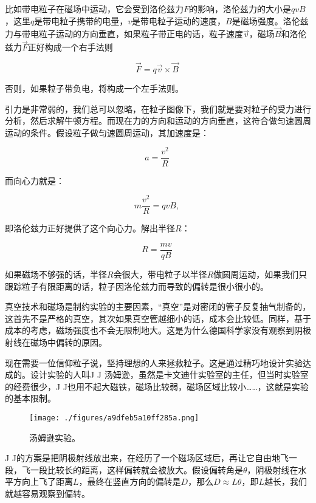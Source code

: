 比如带电粒子在磁场中运动，它会受到洛伦兹力$F$的影响，洛伦兹力的大小是$q v B$，这里$q$是带电粒子携带的电量，$v$是带电粒子运动的速度，$B$是磁场强度。洛伦兹力与带电粒子运动的方向垂直，如果粒子带正电的话，粒子速度$\vec v$，磁场$\vec B$和洛伦兹力$\vec F$正好构成一个右手法则

\begin{equation}
\vec F = q \vec v \times \vec B~
\end{equation}

否则，如果粒子带负电，将构成一个左手法则。

引力是非常弱的，我们总可以忽略，在粒子图像下，我们就是要对粒子的受力进行分析，然后求解牛顿方程。而现在力的方向和运动的方向垂直，这符合做匀速圆周运动的条件。假设粒子做匀速圆周运动，其加速度是：

\begin{equation}
a = \frac{v^2 }{R }~
\end{equation}

而向心力就是：

\begin{equation}
m \frac{v^2}{R} = q v B,~
\end{equation}

即洛伦兹力正好提供了这个向心力。解出半径$R$：

\begin{equation}
R = \frac{mv}{qB}~
\end{equation}

如果磁场不够强的话，半径$R$会很大，带电粒子以半径$R$做圆周运动，如果我们只跟踪粒子有限距离的话，粒子因洛伦兹力而导致的偏转是很小很小的。

真空技术和磁场是制约实验的主要因素，“真空”是对密闭的管子反复抽气制备的，这首先不是严格的真空，其次如果真空管越细小的话，成本会比较低。同样，基于成本的考虑，磁场强度也不会无限制地大。这是为什么德国科学家没有观察到阴极射线在磁场中偏转的原因。

现在需要一位信仰粒子说，坚持理想的人来拯救粒子。这是通过精巧地设计实验达成的。设计实验的人叫J J 汤姆逊，虽然是卡文迪什实验室的主任，但当时实验室的经费很少，J J也用不起大磁铁，磁场比较弱，磁场区域比较小……，这就是实验的基本限制。

\begin{figure}[ht]
\centering
\texttt{[image: ./figures/a9dfeb5a10ff285a.png]}
\caption{汤姆逊实验。} \label{fig_QMPre5_9}
\end{figure}

J J的方案是把阴极射线放出来，在经历了一个磁场区域后，再让它自由地飞一段，飞一段比较长的距离，这样偏转就会被放大。假设偏转角是$\theta$，阴极射线在水平方向上飞了距离$L$，最终在竖直方向的偏转是$D$，那么$D \approx L \theta$，即$L$越长，我们就越容易观察到偏转。

